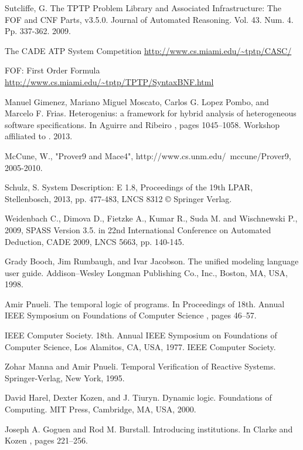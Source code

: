 
\begin{thebibliography}{tesis}

	Sutcliffe, G. The TPTP Problem Library and Associated Infrastructure: The FOF and CNF Parts, v3.5.0. Journal of Automated Reasoning. Vol. 43. Num. 4. Pp. 337-362. 2009.

	The CADE ATP System Competition
	\url{http://www.cs.miami.edu/~tptp/CASC/}

	FOF: First Order Formula
	\url{http://www.cs.miami.edu/~tptp/TPTP/SyntaxBNF.html}

	Manuel Gimenez, Mariano Miguel Moscato, Carlos G. Lopez Pombo, and Marcelo F. Frias. Heterogenius: a framework for hybrid analysis of heterogeneous software specifications. In Aguirre and Ribeiro \cite{AR13}, pages 1045–1058. Workshop affiliated to \cite{DM13}. 2013.
	
	McCune, W., "Prover9 and Mace4", http://www.cs.unm.edu/~mccune/Prover9, 2005-2010. 

  Schulz, S. System Description: E 1.8, Proceedings of the 19th LPAR, Stellenbosch, 2013, pp. 477-483, LNCS 8312 © Springer Verlag.

 Weidenbach C., Dimova D., Fietzke A., Kumar R., Suda M. and Wischnewski P., 2009, SPASS Version 3.5. in 22nd International Conference on Automated Deduction, CADE 2009, LNCS 5663, pp. 140-145.

 Grady Booch, Jim Rumbaugh, and Ivar Jacobson. The unified modeling language user guide. Addison–Wesley Longman Publishing Co., Inc., Boston, MA, USA, 1998.

 Amir Pnueli. The temporal logic of programs. In Proceedings of 18th. Annual IEEE Symposium on Foundations of Computer Science \cite{IEE77}, pages 46–57. 

 IEEE Computer Society. 18th. Annual IEEE Symposium on Foundations of Computer Science, Los Alamitos, CA, USA, 1977. IEEE Computer Society. 

 Zohar Manna and Amir Pnueli. Temporal Verification of Reactive Systems. Springer-Verlag, New York, 1995. 

 David Harel, Dexter Kozen, and J. Tiuryn. Dynamic logic. Foundations of Computing. MIT Press, Cambridge, MA, USA, 2000.  

 Joseph A. Goguen and Rod M. Burstall. Introducing institutions. In Clarke and Kozen \cite{CK84}, pages 221–256.  


\end{thebibliography}
